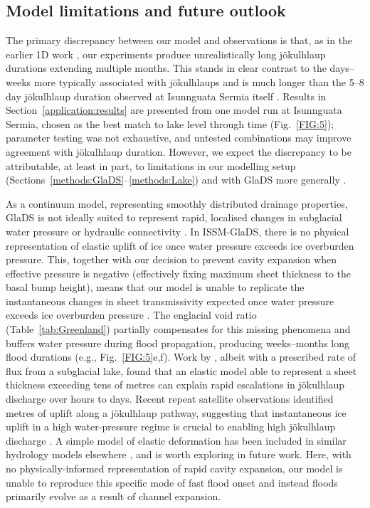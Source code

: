 \documentclass[tc, manuscript]{copernicus}
\begin{document}
\subsection{Model limitations and future outlook}\label{discussion:limitations}

The primary discrepancy between our model and observations is that, as in the earlier 1D work \citep[e.g.,][]{kingslake2013modelling}, our experiments produce unrealistically long jökulhlaup durations extending multiple months. This stands in clear contrast to the days--weeks more typically associated with jökulhlaups \citep[e.g.,][]{bjornsson1992jokulhlaups,bjornsson2010understanding,einarsson2016spectrum,magnusson2026subglacial} and is much longer than the 5--8 day jökulhlaup duration observed at Isunnguata Sermia itself \citep{livingstone2025ice}. Results in Section~\ref{application:results} are presented from one model run at Isunnguata Sermia, chosen as the best match to lake level through time (Fig.~\ref{FIG:5}); parameter testing was not exhaustive, and untested combinations may improve agreement with jökulhlaup duration. However, we expect the discrepancy to be attributable, at least in part, to limitations in our modelling setup (Sections~\ref{methods:GlaDS}--\ref{methods:Lake}) and with GlaDS more generally \citep{werder2013modeling}. 

As a continuum model, representing smoothly distributed drainage properties, GlaDS is not ideally suited to represent rapid, localised changes in subglacial water pressure or hydraulic connectivity \citep{rada2018channelized,hill2025emulator}. In ISSM-GlaDS, there is no physical representation of elastic uplift of ice once water pressure exceeds ice overburden pressure. This, together with our decision to prevent cavity expansion when effective pressure is negative (effectively fixing maximum sheet thickness to the basal bump height), means that our model is unable to replicate the instantaneous changes in sheet transmissivity expected once water pressure exceeds ice overburden pressure \citep[e.g.,][]{tsai2010model,schoof2012flotation,dow2015modeling}. The englacial void ratio (Table~\ref{tab:Greenland}) partially compensates for this missing phenomena and buffers water pressure during flood propagation, producing weeks--months long flood durations (e.g., Fig.~\ref{FIG:5}e,f). Work by \citet{flowers2004coupled}, albeit with a prescribed rate of flux from a subglacial lake, found that an elastic model able to represent a sheet thickness exceeding tens of metres can explain rapid escalations in jökulhlaup discharge over hours to days. Recent repeat satellite observations identified metres of uplift along a jökulhlaup pathway, suggesting that instantaneous ice uplift in a high water-pressure regime is crucial to enabling high jökulhlaup discharge \citep{magnusson2026subglacial}. A simple model of elastic deformation has been included in similar hydrology models elsewhere \citep[e.g.,][]{stevens2022tidewater}, and is worth exploring in future work. Here, with no physically-informed representation of rapid cavity expansion, our model is unable to reproduce this specific mode of fast flood onset and instead floods primarily evolve as a result of channel expansion. 
\end{document}
